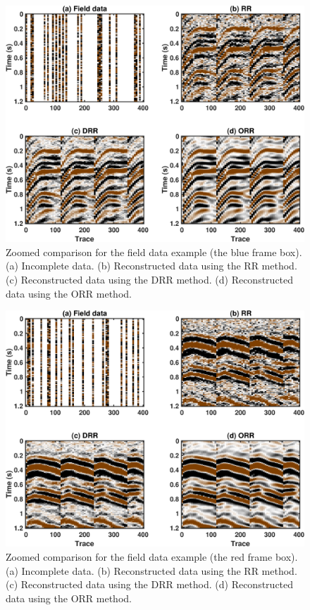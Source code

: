 {\begin{figure}
	\centering
	\includegraphics[width=\textwidth]{Fig/field_dn_N12_z1}
	\caption{Zoomed comparison for the field data example (the blue frame box). (a) Incomplete data. (b) Reconstructed data using the RR method. (c) Reconstructed data using the DRR method. (d) Reconstructed data using the ORR method. }
	\label{fig:field_dn_N12_z1}
\end{figure}

\begin{figure}
	\centering
	\includegraphics[width=\textwidth]{Fig/field_dn_N12_z2}
	\caption{Zoomed comparison for the field data example (the red frame box). (a) Incomplete data. (b) Reconstructed data using the RR method. (c) Reconstructed data using the DRR method. (d) Reconstructed data using the ORR method. }
	\label{fig:field_dn_N12_z2}
\end{figure}

}
